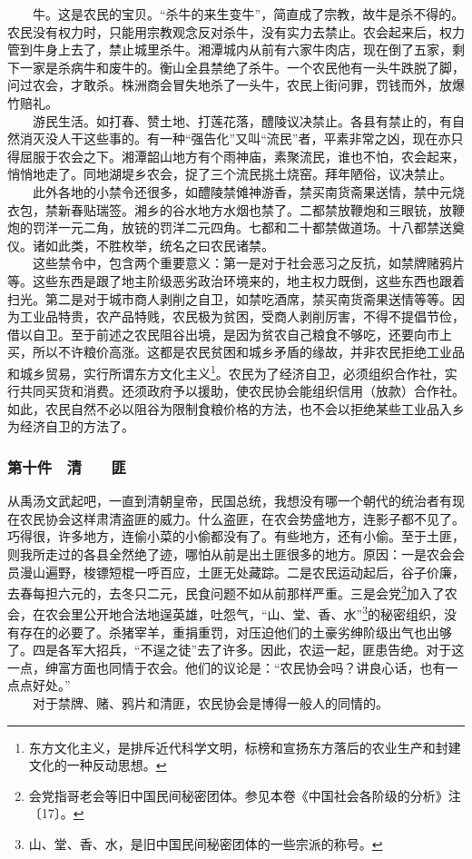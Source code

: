 \documentclass[cn,11pt,chinese]{elegantbook}
\def\myformat#1{\hfil\hfil #1}
\begin{document}
　　牛。这是农民的宝贝。“杀牛的来生变牛”，简直成了宗教，故牛是杀不得的。农民没有权力时，只能用宗教观念反对杀牛，没有实力去禁止。农会起来后，权力管到牛身上去了，禁止城里杀牛。湘潭城内从前有六家牛肉店，现在倒了五家，剩下一家是杀病牛和废牛的。衡山全县禁绝了杀牛。一个农民他有一头牛跌脱了脚，问过农会，才敢杀。株洲商会冒失地杀了一头牛，农民上街问罪，罚钱而外，放爆竹赔礼。\\
　　游民生活。如打春、赞土地、打莲花落，醴陵议决禁止。各县有禁止的，有自然消灭没人干这些事的。有一种“强告化”又叫“流民”者，平素非常之凶，现在亦只得屈服于农会之下。湘潭韶山地方有个雨神庙，素聚流民，谁也不怕，农会起来，悄悄地走了。同地湖堤乡农会，捉了三个流民挑土烧窑。拜年陋俗，议决禁止。\\
　　此外各地的小禁令还很多，如醴陵禁傩神游香，禁买南货斋果送情，禁中元烧衣包，禁新春贴瑞签。湘乡的谷水地方水烟也禁了。二都禁放鞭炮和三眼铳，放鞭炮的罚洋一元二角，放铳的罚洋二元四角。七都和二十都禁做道场。十八都禁送奠仪。诸如此类，不胜枚举，统名之曰农民诸禁。\\
　　这些禁令中，包含两个重要意义：第一是对于社会恶习之反抗，如禁牌赌鸦片等。这些东西是跟了地主阶级恶劣政治环境来的，地主权力既倒，这些东西也跟着扫光。第二是对于城市商人剥削之自卫，如禁吃酒席，禁买南货斋果送情等等。因为工业品特贵，农产品特贱，农民极为贫困，受商人剥削厉害，不得不提倡节俭，借以自卫。至于前述之农民阻谷出境，是因为贫农自己粮食不够吃，还要向市上买，所以不许粮价高涨。这都是农民贫困和城乡矛盾的缘故，并非农民拒绝工业品和城乡贸易，实行所谓东方文化主义\footnote[21]{ 东方文化主义，是排斥近代科学文明，标榜和宣扬东方落后的农业生产和封建文化的一种反动思想。}。农民为了经济自卫，必须组织合作社，实行共同买货和消费。还须政府予以援助，使农民协会能组织信用（放款）合作社。如此，农民自然不必以阻谷为限制食粮价格的方法，也不会以拒绝某些工业品入乡为经济自卫的方法了。\\
\subsubsection*{\myformat{第十件　清　　匪}}
从禹汤文武起吧，一直到清朝皇帝，民国总统，我想没有哪一个朝代的统治者有现在农民协会这样肃清盗匪的威力。什么盗匪，在农会势盛地方，连影子都不见了。巧得很，许多地方，连偷小菜的小偷都没有了。有些地方，还有小偷。至于土匪，则我所走过的各县全然绝了迹，哪怕从前是出土匪很多的地方。原因：一是农会会员漫山遍野，梭镖短棍一呼百应，土匪无处藏踪。二是农民运动起后，谷子价廉，去春每担六元的，去冬只二元，民食问题不如从前那样严重。三是会党\footnote[22]{ 会党指哥老会等旧中国民间秘密团体。参见本卷《中国社会各阶级的分析》注〔17〕。}加入了农会，在农会里公开地合法地逞英雄，吐怨气，“山、堂、香、水”\footnote[23]{ 山、堂、香、水，是旧中国民间秘密团体的一些宗派的称号。}的秘密组织，没有存在的必要了。杀猪宰羊，重捐重罚，对压迫他们的土豪劣绅阶级出气也出够了。四是各军大招兵，“不逞之徒”去了许多。因此，农运一起，匪患告绝。对于这一点，绅富方面也同情于农会。他们的议论是：“农民协会吗？讲良心话，也有一点点好处。”\\
　　对于禁牌、赌、鸦片和清匪，农民协会是博得一般人的同情的。\\
\end{document}
